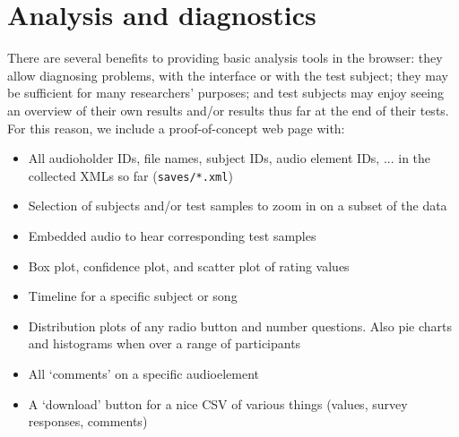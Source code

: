 \documentclass{sig-alternate}
\begin{document}
\section{Analysis and diagnostics}
\label{sec:analysis}
	There are several benefits to providing basic analysis tools in the browser: they allow diagnosing problems, with the interface or with the test subject; they may be sufficient for many researchers' purposes; and test subjects may enjoy seeing an overview of their own results and/or results thus far at the end of their tests. 
	For this reason, we include a proof-of-concept web page with:
	\begin{itemize}[noitemsep,nolistsep]
		\item All audioholder IDs, file names, subject IDs, audio element IDs, ... in the collected XMLs so far (\texttt{saves/*.xml})
		\item Selection of subjects and/or test samples to zoom in on a subset of the data %
		\item Embedded audio to hear corresponding test samples %
		\item Box plot, confidence plot, and scatter plot of rating values
		\item Timeline for a specific subject or song %
		\item Distribution plots of any radio button and number questions. Also pie charts and histograms when over a range of participants %
		\item All `comments' on a specific audioelement
		\item A `download' button for a nice CSV of various things (values, survey responses, comments) %
	\end{itemize}
\end{document}
